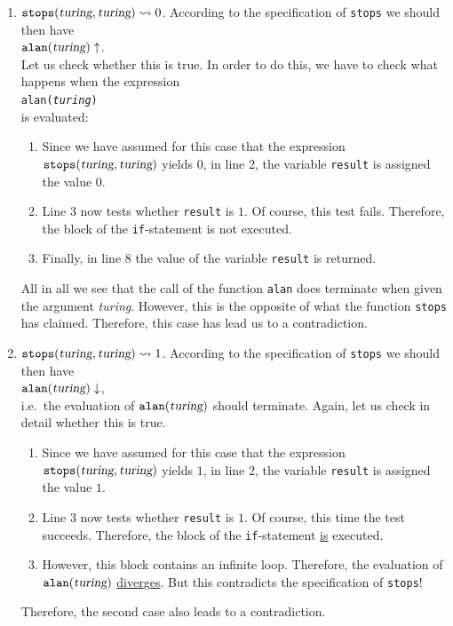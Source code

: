 \begin{enumerate}
\item $\mathtt{stops}(\textsl{turing}, \textsl{turing}) \leadsto 0$.
According to the specification of \texttt{stops} we should then have
      \\[0.2cm]
      \hspace*{1.3cm}
      $\mathtt{alan}(\textsl{turing}) \uparrow$.
\\[0.2cm]
      Let us check whether this is true.
In order to do this, we have to check what happens when
      the expression
      \\[0.2cm]
      \hspace*{1.3cm}
      \texttt{alan(\textsl{turing})} 
      \\[0.2cm]
      is evaluated:
      \begin{enumerate}
      \item Since we have assumed for this case that the expression 
            $\mathtt{stops}(\textsl{turing}, \textsl{turing})$ yields $0$, 
            in line 2, the variable \texttt{result} is assigned the value 0. 
      \item Line 3 now tests whether \texttt{result} is $1$.
Of course,
            this test fails.
Therefore, the block of the \texttt{if}-statement is not executed.
      \item Finally, in line 8 the value of the variable \texttt{result} is returned.
\end{enumerate}
      All in all we see that the call of the function \texttt{alan} does terminate when given the argument
      \textsl{turing}.
However, this is the opposite of what the function \texttt{stops} has claimed.
Therefore, this case has lead us to a contradiction.
\item  $\mathtt{stops}(\textsl{turing}, \textsl{turing}) \leadsto 1$.
According to the specification of \texttt{stops} we should then have
      \\[0.2cm]
      \hspace*{1.3cm}
      $\mathtt{alan}(\textsl{turing}) \downarrow$, 
      \\[0.2cm]
      i.e.~the evaluation of $\mathtt{alan}(\textsl{turing})$ should terminate.
Again, let us check in detail whether this is true.
\begin{enumerate}
      \item Since we have assumed for this case that the expression 
            $\mathtt{stops}(\textsl{turing}, \textsl{turing})$ yields $1$, 
            in line 2, the variable \texttt{result} is assigned the value $1$.
\item Line 3 now tests whether \texttt{result} is $1$.  Of course,
            this time the test succeeds.
Therefore, the block of the \texttt{if}-statement \underline{is} executed.
      \item However, this block contains an infinite loop.
Therefore, the
            evaluation of $\mathtt{alan}(\textsl{turing})$ \underline{diver}g\underline{es}.
But this contradicts the specification of \texttt{stops}!
      \end{enumerate}   
      Therefore, the second case also leads to a contradiction.
\end{enumerate}
